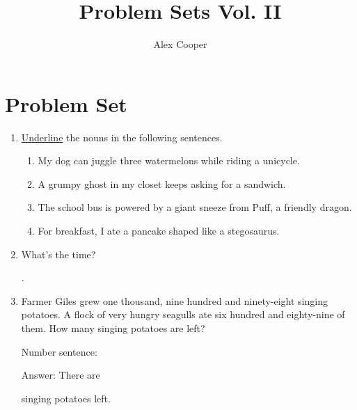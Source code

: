 \documentclass{tufte-book}
\title{Problem Sets Vol. II}
\author[Alex Cooper]{Alex Cooper}
\begin{document}
\frontmatter

\maketitle

\mainmatter

\newpage\section{Problem Set }

\begin{enumerate}
  \item {}
  \underline{Underline} the nouns in the following sentences.
  \begin{enumerate}
    \item My dog can juggle three watermelons while riding a unicycle.
    \item A grumpy ghost in my closet keeps asking for a sandwich.
    \item The school bus is powered by a giant sneeze from Puff, a friendly dragon.
    \item For breakfast, I ate a pancake shaped like a stegosaurus.
  \end{enumerate}

  \item \bigskip{} 
  What's the time? \dotfill\bigskip\par\dotfill\bigskip.
  
  \item Farmer Giles grew one thousand, nine hundred and ninety-eight singing potatoes.
  A flock of very hungry seagulls ate six hundred and eighty-nine of them.
  How many singing potatoes are left?\bigskip\par
Number sentence: \dotfill\bigskip\par
Answer: There are
\dotfill\bigskip\par\mbox{}\dotfill\bigskip\par\mbox{}\dotfill\bigskip\par\dotfill\bigskip
 singing potatoes left.


\end{enumerate}
\end{document}
